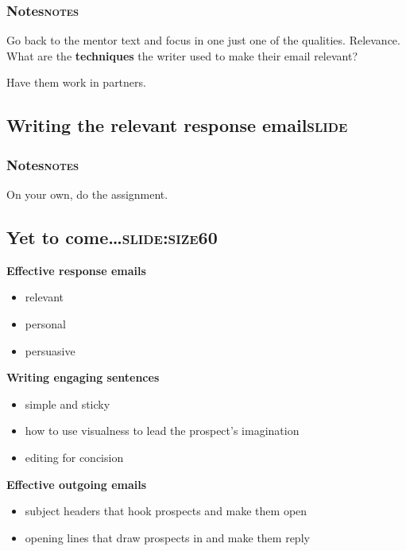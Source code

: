 \documentclass[12pt]{article}
\begin{document}
\subsubsection[Notes]{Notes\hfill{}\textsc{notes}}
\label{sec:org55d6da1}
Go back to the mentor text and focus in one just one of the qualities. Relevance. What are the \textbf{techniques} the writer used to make their email relevant?

Have them work in partners.

\subsection[Writing the relevant response email]{Writing the relevant response email\hfill{}\textsc{slide}}
\label{sec:orgd3313bb}

\subsubsection[Notes]{Notes\hfill{}\textsc{notes}}
\label{sec:org491b24e}
On your own, do the assignment.

\subsection[Yet to come\ldots{}]{Yet to come\ldots{}\hfill{}\textsc{slide:size60}}
\label{sec:orgc7a7f8c}

\textbf{Effective response emails}
\begin{itemize}
\item relevant
\item personal
\item persuasive
\end{itemize}

\textbf{Writing engaging sentences}
\begin{itemize}
\item simple and sticky
\item how to use visualness to lead the prospect's imagination
\item editing for concision
\end{itemize}

\textbf{Effective outgoing emails}
\begin{itemize}
\item subject headers that hook prospects and make them open
\item opening lines that draw prospects in and make them reply
\end{itemize}
\end{document}

